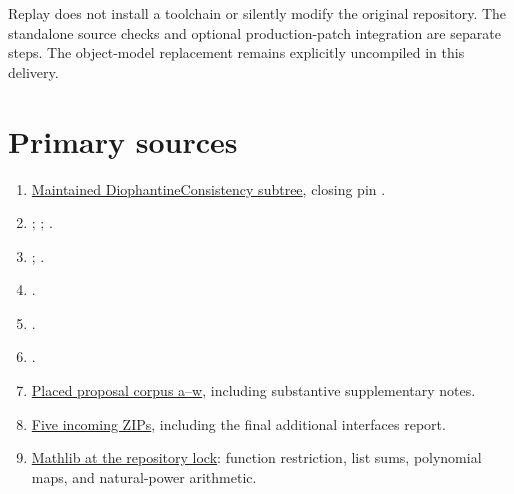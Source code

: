 Replay does not install a toolchain or silently modify the original
repository. The standalone source checks and optional production-patch
integration are separate steps. The object-model replacement remains
explicitly uncompiled in this delivery.

\section*{Primary sources}

\begin{enumerate}
\item \href{\repo/tree/\pin/Computability/DiophantineConsistency}
{Maintained DiophantineConsistency subtree}, closing pin .
\item {};
;
.
\item {};
.
\item {}.
\item {}.
\item {}.
\item \href{\repo/tree/\pin/Computability/DiophantineConsistency/research/lean-proof-simplification}
{Placed proposal corpus a--w}, including substantive supplementary notes.
\item \href{\repo/tree/\pin/docs/incoming}{Five incoming ZIPs}, including
the final additional interfaces report.
\item \href{https://github.com/leanprover-community/mathlib4/tree/81a5d257c8e410db227a6665ed08f64fea08e997/Mathlib}
{Mathlib at the repository lock}: function restriction, list sums,
polynomial maps, and natural-power arithmetic.
\end{enumerate}
